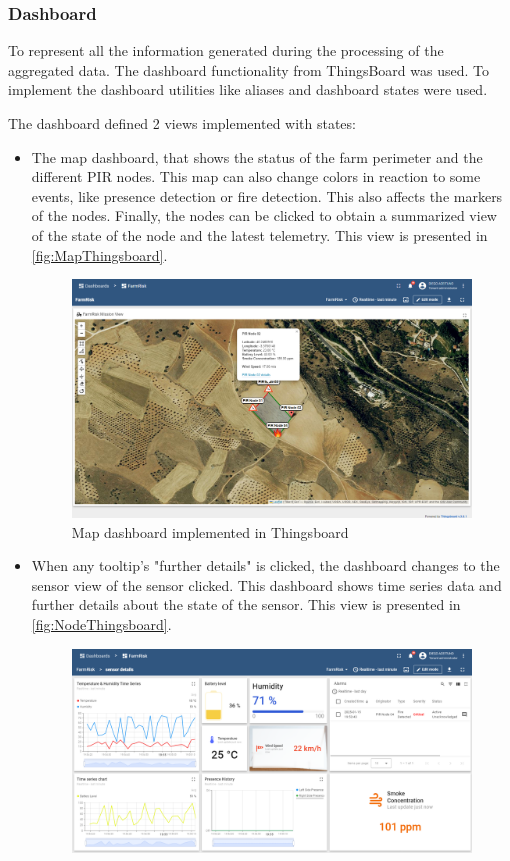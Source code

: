 \subsubsection*{Dashboard}

To represent all the information generated during the processing of the aggregated data. The dashboard 
functionality from ThingsBoard was used. To implement the dashboard utilities like aliases and dashboard 
states were used.

The dashboard defined 2 views implemented with states:
\begin{itemize}
    \item The map dashboard, that shows the status of the farm perimeter and the different PIR nodes. This map can also change colors in reaction 
    to some events, like presence detection or fire detection. This also affects the markers of the nodes. Finally, the nodes can be clicked to obtain 
    a summarized view of the state of the node and the latest telemetry. This view is presented in \autoref{fig:MapThingsboard}.
    \begin{figure}[H]
        \centering
        \includegraphics[width=1\textwidth]{./images/8/MapDashboard.png}
        \caption{Map dashboard implemented in Thingsboard}
        \label{fig:MapThingsboard}
    \end{figure}
    \item When any tooltip's "further details" is clicked, the dashboard changes to the sensor view of the sensor clicked. This dashboard 
    shows time series data and further details about the state of the sensor. This view is presented in \autoref{fig:NodeThingsboard}. 
    \begin{figure}[H]
        \centering
        \includegraphics[width=1\textwidth]{./images/8/NodeDashboard.png}

\end{figure}
\end{itemize}

